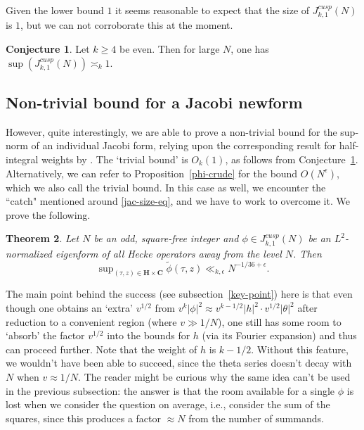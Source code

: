 \documentclass[11pt]{amsart}
\numberwithin{equation}{section}
\theoremstyle{plain}
\newtheorem{thm}{Theorem}[section]
\theoremstyle{definition}
\newtheorem{conj}[thm]{Conjecture}
\newcommand{\propref}[1]{Proposition~\ref{#1}}
\newcommand{\conjref}[1]{Conjecture~\ref{#1}}
\newcommand{\C}{\mf C}
\newcommand{\h}{\mf H}
\newcommand{\mf}{\mathbf}
\newcommand{\jkn}{J^{cusp}_{k,1}(N)}
\begin{document}
Given the lower bound $1$ it seems reasonable to expect that the size of $J^{cusp}_{k,1}(N)$ is $1$, but we can not corroborate this at the moment.
\begin{conj} \label{jacobi-conj}
    Let $k \ge 4$ be even. Then for large $N$, one has $\displaystyle \sup( J^{cusp}_{k,1}(N)) \asymp_k 1$.
\end{conj}

\subsection{Non-trivial bound for a Jacobi newform}
However, quite interestingly, we are able to prove a non-trivial bound for the sup-norm of an individual Jacobi form, relying upon the corresponding result for half-integral weights by \cite{Kir}. The `trivial bound' is $O_k(1)$, as follows from \conjref{jacobi-conj}. Alternatively, we can refer to \propref{phi-crude} for the bound $O(N^\epsilon)$, which we also call the trivial bound.
In this case as well, we encounter the ``catch" mentioned around \eqref{jac-size-eq}, and we have to work to overcome it. We prove the following.

\begin{thm}\label{thm:indJacobi}
    Let $N$ be an odd, square-free integer and $\phi\in\jkn$ be an $L^2$-normalized eigenform of all Hecke operators away from the level $N$. Then 
    \begin{equation}
        \sup \nolimits_{(\tau,z) \in \h\times\C}  \widetilde \phi (\tau,z) \ll _{k,\epsilon} N^{-1/36+\epsilon}.
    \end{equation}
\end{thm}
The main point behind the success (see subsection~\ref{key-point}) here is that even though one obtains an `extra' $v^{1/2}$ from $\displaystyle v^k |\phi|^2 \approx v^{k-1/2}|h|^2 \cdot v^{1/2} |\theta|^2$ after reduction to a convenient region (where $v \gg 1/N$), one still has some room to `absorb' the factor $v^{1/2}$ into the bounds for $h$ (via its Fourier expansion) and thus can proceed further. Note that the weight of $h$ is $k-1/2$.
Without this feature, we wouldn't have been able to succeed, since the theta series doesn't decay with $N$ when $v \approx 1/N$. The reader might be curious why the same idea can't be used in the previous subsection: the answer is that the room available for a single $\phi$ is lost when we consider the question on average, i.e., consider the sum of the squares, since this produces a factor $\approx N$ from the number of summands.
\end{document}
